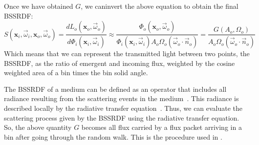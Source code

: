 \documentclass[10pt,a4paper]{article}
\newcommand{\x}{\mathbf{x}}
\newcommand{\vomega}{\vec{\omega}}
\begin{document}
Once we have obtained $G$, we caninvert the above equation to obtain the final BSSRDF:
\begin{equation}
S(\x_i, \vomega_i, \x_o, \vomega_o) = \frac{d L_o(\x_o, \vomega_o)}{d\Phi_i(\x_i, \vomega_i)} \approx \frac{\Phi_o(\x_o, \vomega_o)}{\Phi_i(\x_i, \vomega_i) A_o \Omega_o (\vomega_o \cdot \vec{n}_o)} = \frac{G(A_o, \Omega_o)}{ A_o \Omega_o (\vomega_o \cdot \vec{n}_o)} 
\label{eq:bssrdf}
\end{equation}
Which means that we can represent the transmitted light between two points, the BSSRDF, as the ratio of emergent and incoming flux, weighted by the cosine weighted area of a bin times the bin solid angle.

The BSSRDF of a medium can be defined as an operator that includes all radiance resulting from the scattering events in the medium~\citep{preisendorfer65}. This radiance is described locally by the radiative transfer equation~\citep{preisendorfer65}. Thus, we can evaluate the scattering process given by the BSSRDF using the radiative transfer equation. So, the above quantity $G$ becomes all flux carried by a flux packet arriving in a bin after going through the random walk. This is the procedure used in \cite{wang1995}.
\end{document}
